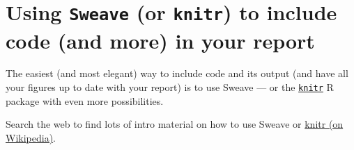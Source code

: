 \section{Using \texttt{Sweave} (or \texttt{knitr}) to include \Rp code (and more) in your report}
The easiest (and most elegant) way to include \Rp code and its output (and
have all your figures up to date with your report) is to use Sweave --- or the
\href{https://cran.R-project.org/package=knitr}{\texttt{knitr}} R package with even more possibilities.

Search the web to find lots of intro material on how to use Sweave or
\href{https://en.wikipedia.org/wiki/Knitr}{knitr (on Wikipedia)}.

